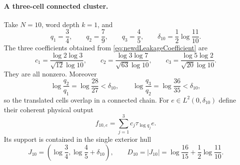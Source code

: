 \paragraph{A three-cell connected cluster.}
Take $N=10$, word depth $k=1$, and
\begin{equation}\label{eq:newdThreeCellLabels}
 q_1=\frac34,
 \qquad q_2=\frac79,
 \qquad q_3=\frac45,
 \qquad
 \delta_{10}=\frac12\log\frac{11}{10}.
\end{equation}
The three coefficients obtained from
\eqref{eq:newdLeakageCoefficient} are
\begin{equation}\label{eq:newdThreeCellCoefficients}
 c_1=\frac{\log2\log3}{\sqrt{12}\log10},
 \qquad
 c_2=\frac{\log3\log7}{\sqrt{63}\log10},
 \qquad
 c_3=\frac{\log5\log2}{\sqrt{20}\log10}.
\end{equation}
They are all nonzero.  Moreover
\begin{equation}\label{eq:newdThreeCellConnections}
 \log\frac{q_2}{q_1}=\log\frac{28}{27}<\delta_{10},
 \qquad
 \log\frac{q_3}{q_2}=\log\frac{36}{35}<\delta_{10},
\end{equation}
so the translated cells overlap in a connected chain.  For
$e\in L^2(0,\delta_{10})$ define their coherent physical output
\begin{equation}\label{eq:newdThreeCellOutput}
 f_{10,e}=\sum_{j=1}^3c_j\tau_{\log q_j}e.
\end{equation}
Its support is contained in the single exterior hull
\begin{equation}\label{eq:newdThreeCellHull}
 J_{10}=\left(\log\frac34,
              \log\frac45+\delta_{10}\right),
 \qquad
 D_{10}=|J_{10}|=\log\frac{16}{15}
                 +\frac12\log\frac{11}{10}.
\end{equation}

